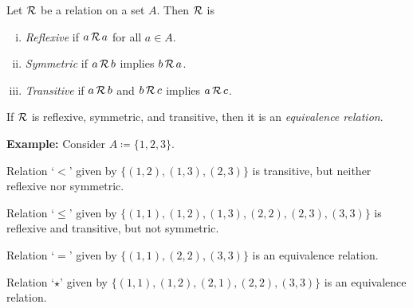 \documentclass[10pt,aspectratio=169]{beamer}
\begin{document}
\begin{frame}

\begin{definition}
Let ${\mathcal{R}}$ be a relation on a set $A$.
\pause
Then ${\mathcal{R}}$ is
\begin{enumerate}[(i)]
\item
\emph{Reflexive} if $a\, {\mathcal{R}} \, a$ for
all $a \in A$.
\pause
\item
\emph{Symmetric} if $a\, {\mathcal{R}} \, b$ implies
$b \, {\mathcal{R}} \, a$.
\pause
\item
\emph{Transitive} if $a\, {\mathcal{R}} \, b$ and
$b \, {\mathcal{R}} \, c$ implies $a\, {\mathcal{R}} \, c$.
\end{enumerate}
\pause
If ${\mathcal{R}}$ is reflexive, symmetric, and transitive, then it is
an \emph{equivalence relation}.
\end{definition}
\pause

\textbf{Example:} Consider $A \coloneqq \{ 1,2,3 \}$.

\medskip
\pause

Relation `$<$' given by
$\bigl\{ (1,2), (1,3), (2,3) \bigr\}$
is transitive, but neither reflexive nor symmetric.

\medskip
\pause

Relation `$\leq$' given by
$\bigl\{ (1,1), (1,2), (1,3), (2,2), (2,3), (3,3) \bigr\}$
is reflexive and transitive, but not symmetric.

\medskip
\pause

Relation `$=$' given by
$\bigl\{ (1,1), (2,2), (3,3) \bigr\}$ is
an equivalence relation.

\medskip
\pause

Relation `$\star$' given by
$\bigl\{ (1,1), (1,2), (2,1), (2,2), (3,3) \bigr\}$ is
an equivalence relation.

\end{frame}
\end{document}

